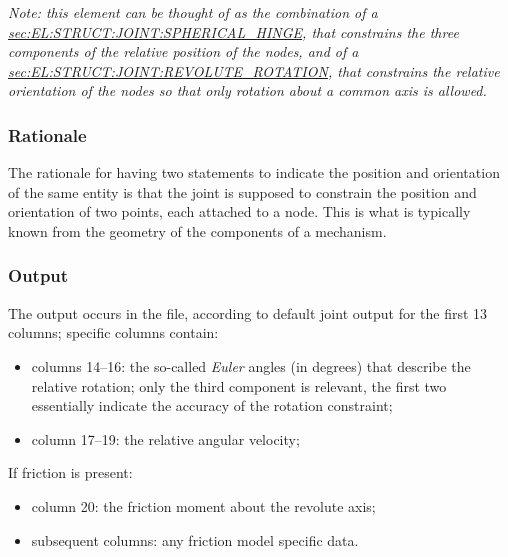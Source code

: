 \emph{Note: this element can be thought of as the combination of a 
\hyperref{\kw{spherical hinge}}{\kw{spherical hinge} (see Section~}{)}{sec:EL:STRUCT:JOINT:SPHERICAL_HINGE},
that constrains the three components of the relative position
of the nodes, and of a
\hyperref{\kw{revolute rotation}}{\kw{revolute rotation} (see Section~}{)}{sec:EL:STRUCT:JOINT:REVOLUTE_ROTATION},
that constrains the relative orientation of the nodes so that only rotation
about a common axis is allowed.}

\subsubsection{Rationale}
The rationale for having two statements to indicate the position
and orientation of the same entity is that the joint is supposed
to constrain the position and orientation of two points,
each attached to a node.
This is what is typically known from the geometry of the components
of a mechanism.

\subsubsection{Output}
The output occurs in the  file, according to default joint output
for the first 13 columns; specific columns contain:
\begin{itemize}
\item columns 14--16: the so-called \emph{Euler} angles (in degrees)
	that describe the relative rotation; only the third component
	is relevant, the first two essentially indicate the accuracy
	of the rotation constraint;
\item column 17--19: the relative angular velocity;
\end{itemize}
If friction is present:
\begin{itemize}
\item column 20: the friction moment about the revolute axis;
\item subsequent columns: any friction model specific data.
\end{itemize}

